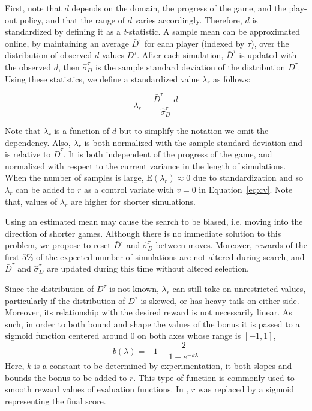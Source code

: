\documentclass{ecai2014}
\newcommand{\E}[1]{\mathrm{E}\left( #1 \right)}
\begin{document}
First, note that $d$ depends on the domain, the progress of the game, and the play-out policy, and that the range of $d$ varies accordingly. Therefore, $d$ is standardized by defining it as a \emph{t}-statistic. A sample mean can be approximated online, by maintaining an average $\bar{D}^\tau$ for each player (indexed by $\tau$), over the distribution of observed $d$ values $D^\tau$. After each simulation, $\bar{D}^\tau$ is updated with the observed $d$, then $\hat{\sigma}^\tau_D$ is the sample standard deviation of the distribution $D^\tau$. Using these statistics, we define a standardized value $\lambda_r$ as follows:

\begin{equation}
\lambda_r = \frac{\bar{D}^\tau - d}{\hat{\sigma}^\tau_D}
\label{eq:rb_norm}
\end{equation}

Note that $\lambda_r$ is a function of $d$ but to simplify the notation we omit the dependency.%
Also, $\lambda_r$ is both normalized with the sample standard deviation and is relative to $\bar{D}^\tau$. It is both independent of the progress of the game, and normalized with respect to the current variance in the length of simulations. When the number of samples is large, $\E{\lambda_r} \approx 0$ due to standardization and so $\lambda_r$ can be added to $r$ as a control variate with $v = 0$ in Equation~\ref{eq:cv}. Note that, values of $\lambda_r$ are higher for shorter simulations.

Using an estimated mean may cause the search to be biased, i.e. moving into the direction of shorter games. Although there is no immediate solution to this problem, we propose to reset $\bar{D}^\tau$ and $\hat{\sigma}^\tau_D$ between moves. Moreover, rewards of the first $5\%$ of the expected number of simulations are not altered during search, and $\bar{D}^\tau$ and $\hat{\sigma}^\tau_D$ are updated during this time without altered selection.

Since the distribution of $D^\tau$ is not known, $\lambda_r$ can still take on unrestricted values, particularly if the distribution of $D^\tau$ is skewed, or has heavy tails on either side. Moreover, its relationship with the desired reward is not necessarily linear. As such, in order to both bound and shape the values of the bonus it is passed to a sigmoid function centered around $0$ on both axes whose range is $[-1,1]$,
\begin{equation}
b(\lambda)=-1+\frac{2}{1+e^{-k\lambda}}
\label{eq:sigmoid}
\end{equation}
Here, $k$ is a constant to be determined by experimentation, it both slopes and bounds the bonus to be added to $r$. This type of function is commonly used to smooth reward values of evaluation functions. In \cite{shibahara2008combining}, $r$ was replaced by a sigmoid representing the final score.
\end{document}

